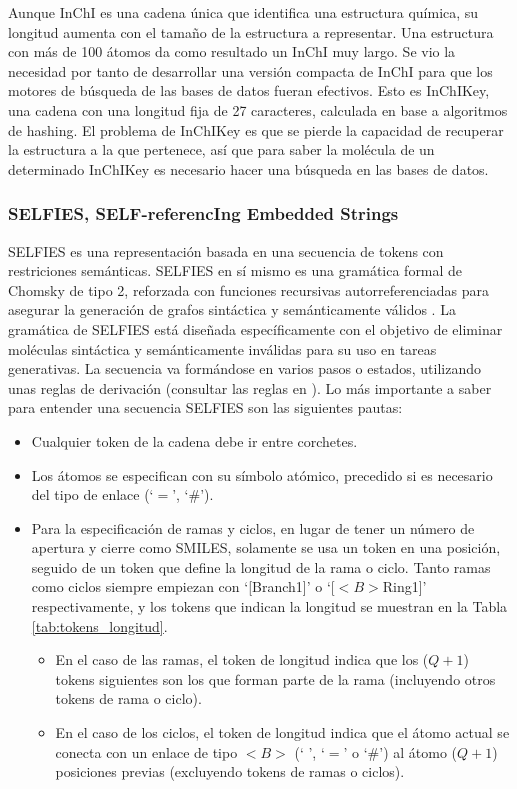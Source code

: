 Aunque InChI es una cadena única que identifica una estructura química, su longitud aumenta con el tamaño de la estructura a representar. Una estructura con más de 100 átomos da como resultado un InChI muy largo. Se vio la necesidad por tanto de desarrollar una versión compacta de InChI para que los motores de búsqueda de las bases de datos fueran efectivos. Esto es InChIKey, una cadena con una longitud fija de 27 caracteres, calculada en base a algoritmos de hashing. El problema de InChIKey es que se pierde la capacidad de recuperar la estructura a la que pertenece, así que para saber la molécula de un determinado InChIKey es necesario hacer una búsqueda en las bases de datos.

\subsubsection{SELFIES, SELF-referencIng Embedded Strings}

SELFIES es una representación basada en una secuencia de tokens con restriciones semánticas. SELFIES en sí mismo es una gramática formal de Chomsky de tipo 2, reforzada con funciones recursivas autorreferenciadas para asegurar la generación de grafos sintáctica y semánticamente válidos \cite{krenn_selfies_example}. La gramática de SELFIES está diseñada específicamente con el objetivo de eliminar moléculas sintáctica y semánticamente inválidas para su uso en tareas generativas.
La secuencia va formándose en varios pasos o estados, utilizando unas reglas de derivación (consultar las reglas en \cite{selfies_derivation_rules, krenn_selfies_example}).
Lo más importante a saber para entender una secuencia SELFIES son las siguientes pautas:
\begin{itemize}
    \item Cualquier token de la cadena debe ir entre corchetes.
    \item Los átomos se especifican con su símbolo atómico, precedido si es necesario del tipo de enlace (`$=$', `\#').
    \item Para la especificación de ramas y ciclos, en lugar de tener un número de apertura y cierre como SMILES, solamente se usa un token en una posición, seguido de un token que define la longitud de la rama o ciclo. Tanto ramas como ciclos siempre empiezan con `[Branch1]' o `[$<B>$Ring1]' respectivamente, y los tokens que indican la longitud se muestran en la Tabla \ref{tab:tokens_longitud}.
    \begin{itemize}
        \item En el caso de las ramas, el token de longitud indica que los ($Q+1$) tokens siguientes son los que forman parte de la rama (incluyendo otros tokens de rama o ciclo).
        \item En el caso de los ciclos, el token de longitud indica que el átomo actual se conecta con un enlace de tipo $<B>$ (` ', `$=$' o `\#') al átomo ($Q+1$) posiciones previas (excluyendo tokens de ramas o ciclos). 
    \end{itemize}
\end{itemize}

